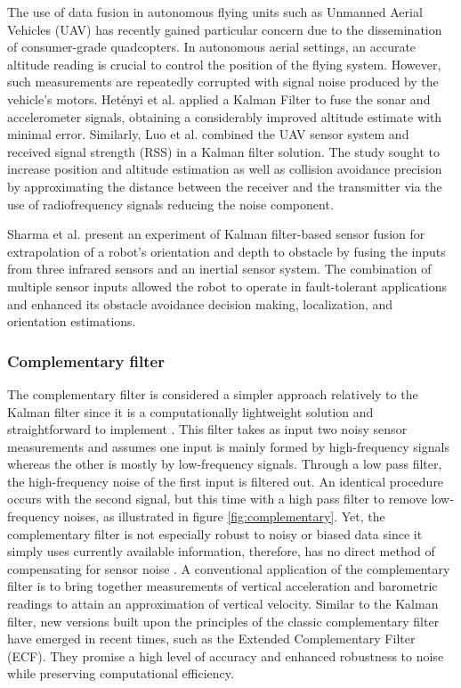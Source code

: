 The use of data fusion in autonomous flying units such as Unmanned Aerial Vehicles (UAV) has recently gained particular concern due to the dissemination of consumer-grade quadcopters. In autonomous aerial settings, an accurate altitude reading is crucial to control the position of the flying system. However, such measurements are repeatedly corrupted with signal noise produced by the vehicle’s motors. Hetényi et al. \cite{hetenyi2016sensor} applied a Kalman Filter to fuse the sonar and accelerometer signals, obtaining a considerably improved altitude estimate with minimal error. Similarly, Luo et al. \cite{luo2013uav} combined the UAV sensor system and received signal strength (RSS) in a Kalman filter solution. The study sought to increase position and altitude estimation as well as collision avoidance precision by approximating the distance between the receiver and the transmitter via the use of radiofrequency signals reducing the noise component.

Sharma et al. \cite{sharma2014sensor} present an experiment of Kalman filter-based sensor fusion for extrapolation of a robot’s orientation and depth to obstacle by fusing the inputs from three infrared sensors and an inertial sensor system. The combination of multiple sensor inputs allowed the robot to operate in fault-tolerant applications and enhanced its obstacle avoidance decision making, localization, and orientation estimations.

\subsubsection{Complementary filter}
The complementary filter is considered a simpler approach relatively to the Kalman filter since it is a computationally lightweight solution and straightforward to implement \cite{higgins1975comparison}. This filter takes as input two noisy sensor measurements and assumes one input is mainly formed by high-frequency signals whereas the other is mostly by low-frequency signals. Through a low pass filter, the high-frequency noise of the first input is filtered out. An identical procedure occurs with the second signal, but this time with a high pass filter to remove low-frequency noises, as illustrated in figure \ref{fig:complementary}. Yet, the complementary filter is not especially robust to noisy or biased data since it simply uses currently available information, therefore, has no direct method of compensating for sensor noise \cite{wilson2019formulation}. A conventional application of the complementary filter is to bring together measurements of vertical acceleration and barometric readings to attain an approximation of vertical velocity. Similar to the Kalman filter, new versions built upon the principles of the classic complementary filter have emerged in recent times, such as the Extended Complementary Filter (ECF). They promise a high level of accuracy and enhanced robustness to noise while preserving computational efficiency.


